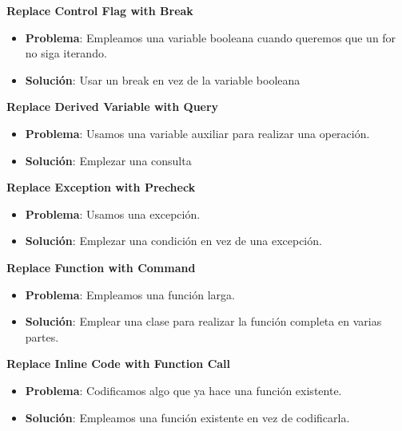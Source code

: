 \documentclass[11pt,a4paper,oneside]{book}
\begin{document}
\textbf{Replace Control Flag with Break}
\label{replaceControlFlagWithBreak}
\begin{itemize}
    \item \textbf{Problema}: Empleamos una variable booleana cuando queremos que un for no siga iterando.
    
    \item \textbf{Solución}: Usar un break en vez de la variable booleana
    
\end{itemize}

\textbf{Replace Derived Variable with Query}
\label{replaceDerivedVariableWithQuery}
\begin{itemize}
    \item \textbf{Problema}: Usamos una variable auxiliar para realizar una operación.
    
    \item \textbf{Solución}: Emplezar una consulta
    
\end{itemize}

\textbf{Replace Exception with Precheck}
\label{replaceExceptionWithPrecheck}
\begin{itemize}
    \item \textbf{Problema}: Usamos una excepción.
    
    \item \textbf{Solución}: Emplezar una condición en vez de una excepción.
    
\end{itemize}

\textbf{Replace Function with Command}
\label{replaceFunctionWithCommand}
\begin{itemize}
    \item \textbf{Problema}: Empleamos una función larga.
    
    \item \textbf{Solución}: Emplear una clase para realizar la función completa en varias partes.
    
\end{itemize}

\textbf{Replace Inline Code with Function Call}
\label{replaceInlineCodeWithFunctionCall}
\begin{itemize}
    \item \textbf{Problema}: Codificamos algo que ya hace una función existente.
    
    \item \textbf{Solución}: Empleamos una función existente en vez de codificarla.
    
\end{itemize}
\end{document}

